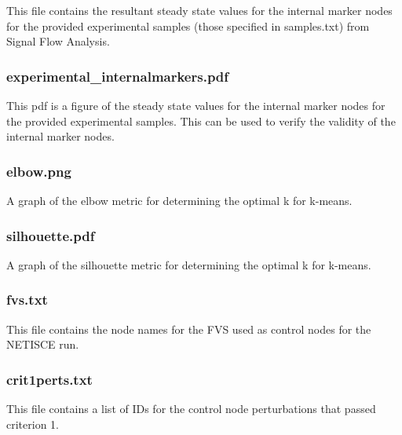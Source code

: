 \documentclass[
]{book}
\theoremstyle{definition}
\theoremstyle{definition}
\theoremstyle{definition}
\theoremstyle{definition}
\theoremstyle{remark}
\begin{document}
This file contains the resultant steady state values for the internal marker nodes for the provided experimental samples (those specified in samples.txt) from Signal Flow Analysis.

\hypertarget{section-id}{%
\subsubsection*{experimental\_internalmarkers.pdf}\label{section-id}}

This pdf is a figure of the steady state values for the internal marker nodes for the provided experimental samples. This can be used to verify the validity of the internal marker nodes.

\hypertarget{section-id}{%
\subsubsection*{elbow.png}\label{section-id}}

A graph of the elbow metric for determining the optimal k for k-means.

\hypertarget{section-id}{%
\subsubsection*{silhouette.pdf}\label{section-id}}

A graph of the silhouette metric for determining the optimal k for k-means.

\hypertarget{section-id}{%
\subsubsection*{fvs.txt}\label{section-id}}

This file contains the node names for the FVS used as control nodes for the NETISCE run.

\hypertarget{section-id}{%
\subsubsection*{crit1perts.txt}\label{section-id}}

This file contains a list of IDs for the control node perturbations that passed criterion 1.
\end{document}

